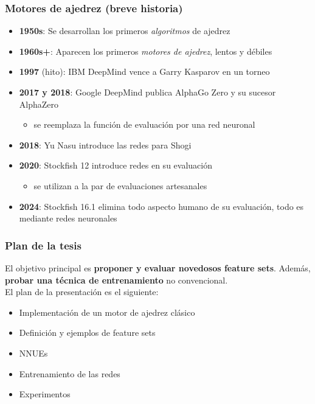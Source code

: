 \begin{frame}
\frametitle{Motores de ajedrez (breve historia)}
\begin{itemize}
    \item<1-> \textbf{1950s}: Se desarrollan los primeros \textit{algoritmos} de ajedrez
    \item<2-> \textbf{1960s+}: Aparecen los primeros \textit{motores de ajedrez}, lentos y débiles
    \item<3-> \textbf{1997} (hito): IBM DeepMind vence a Garry Kasparov en un torneo
    \item<4-> \textbf{2017 y 2018}: Google DeepMind publica AlphaGo Zero y su sucesor AlphaZero
    \begin{itemize}
        \item se reemplaza la función de evaluación por una red neuronal
    \end{itemize}
    \item<5-> \textbf{2018}: Yu Nasu introduce las redes  para Shogi
    \item<6-> \textbf{2020}: Stockfish 12 introduce redes  en su evaluación
    \begin{itemize}
        \item se utilizan a la par de evaluaciones artesanales
    \end{itemize}
    \item<7-> \textbf{2024}: Stockfish 16.1 elimina todo aspecto humano de su evaluación, todo es mediante redes neuronales
\end{itemize}
\end{frame}

\begin{frame}
\frametitle{Plan de la tesis}
El objetivo principal es \textbf{proponer y evaluar novedosos feature sets}. \pause Además, \textbf{probar una técnica de entrenamiento} no convencional. \\
\pause
\vspace{1em}
El plan de la presentación es el siguiente:
\begin{itemize}
\item<3-> Implementación de un motor de ajedrez clásico
\item<4-> Definición y ejemplos de feature sets
\item<5-> NNUEs
\item<6-> Entrenamiento de las redes
\item<7-> Experimentos
\end{itemize}
\end{frame}

